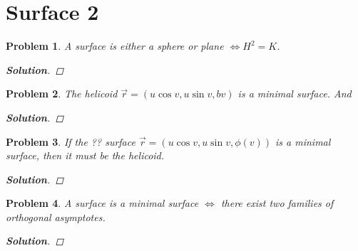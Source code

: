 \documentclass[11pt]{article}
\newtheorem{problem}{Problem}
\numberwithin{problem}{section}
\newenvironment{solution}
               {\let\oldqedsymbol=\qedsymbol
                \renewcommand{\qedsymbol}{$\blacktriangleleft$}
                \begin{proof}[\bfseries\upshape Solution]}
               {\end{proof}
                \renewcommand{\qedsymbol}{\oldqedsymbol}}
\begin{document}
\section{Surface 2}



\begin{problem}

A surface is either a sphere or plane $\Leftrightarrow H^2 = K$. 

\begin{solution}


\end{solution}
\end{problem}
\begin{problem}

The helicoid $\vec{r} = (u \cos v, u \sin v, bv) $ is a minimal surface. And 

\begin{solution}


\end{solution}
\end{problem}
\begin{problem}

If the ?? surface $\vec{r} = (u \cos v, u \sin v, \phi(v))$ is a minimal surface, then it must be the helicoid.

\begin{solution}


\end{solution}
\end{problem}
\begin{problem}

A surface is a minimal surface $\Leftrightarrow$ there exist two families of orthogonal asymptotes.

\begin{solution}


\end{solution}
\end{problem}
\end{document}
